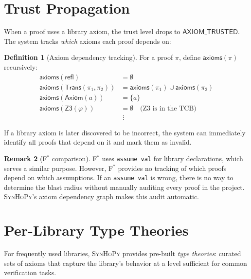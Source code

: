 \documentclass[11pt,a4paper]{report}
\theoremstyle{definition}
\newtheorem{definition}{Definition}[chapter]
\newtheorem{remark}[definition]{Remark}
\theoremstyle{plain}
\newcommand{\Refl}{\mathsf{refl}}
\newcommand{\Trans}{\mathsf{Trans}}
\newcommand{\fstar}{F$^{*}$}
\newcommand{\synhopy}{\textsc{SynHoPy}}
\begin{document}
\section{Trust Propagation}

When a proof uses a library axiom, the trust level drops to
$\mathsf{AXIOM\_TRUSTED}$.  The system tracks \emph{which} axioms each proof
depends on:

\begin{definition}[Axiom dependency tracking]
For a proof $\pi$, define $\mathsf{axioms}(\pi)$ recursively:
\begin{align}
  \mathsf{axioms}(\Refl) &= \emptyset \\
  \mathsf{axioms}(\Trans(\pi_1, \pi_2)) &= \mathsf{axioms}(\pi_1) \cup \mathsf{axioms}(\pi_2) \\
  \mathsf{axioms}(\mathsf{Axiom}(a)) &= \{a\} \\
  \mathsf{axioms}(\mathsf{Z3}(\varphi)) &= \emptyset \quad\text{(Z3 is in the TCB)} \\
  &\;\vdots
\end{align}
\end{definition}

If a library axiom is later discovered to be incorrect, the system can
immediately identify all proofs that depend on it and mark them as invalid.

\begin{remark}[\fstar{} comparison]
\fstar{} uses \lstinline[style=fstar]{assume val} for library declarations,
which serves a similar purpose.  However, \fstar{} provides no tracking of
which proofs depend on which assumptions.  If an \lstinline[style=fstar]{assume val}
is wrong, there is no way to determine the blast radius without manually
auditing every proof in the project.  \synhopy{}'s axiom dependency graph
makes this audit automatic.
\end{remark}

\section{Per-Library Type Theories}

For frequently used libraries, \synhopy{} provides pre-built \emph{type theories}:
curated sets of axioms that capture the library's behavior at a level
sufficient for common verification tasks.
\end{document}
